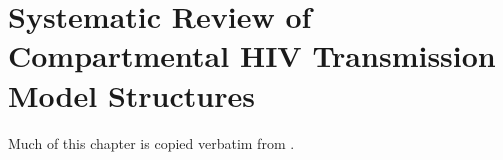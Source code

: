 \chapter{Systematic Review of Compartmental HIV Transmission Model Structures}\label{sr}
Much of this chapter is copied verbatim from \cite{Knight2022-sr}.




\printchapterbibliography
